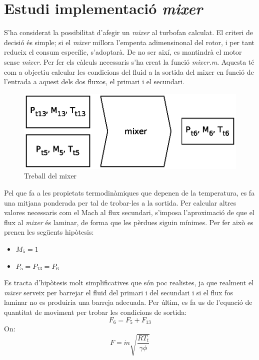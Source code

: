 \section{Estudi implementació \textit{mixer}}
S'ha considerat la possibilitat d'afegir un \textit{mixer} al turbofan calculat. El criteri de decisió és simple; si el \textit{mixer} millora l'empenta adimensinonal del rotor, i per tant redueix el consum específic, s'adoptarà. De no ser així, es mantindrà el motor sense \textit{mixer}. Per fer els càlculs necessaris s'ha creat la funció \textit{mixer.m}. Aquesta té com a objectiu calcular les condicions del fluid a la sortida del mixer en funció de l'entrada a aquest dels dos fluxos, el primari i el secundari.
\begin{figure}[H]
	\centering
	\includegraphics[scale=0.65]{./pics/mixer.eps}
	\caption{Treball del mixer}
\end{figure}
\noindent Pel que fa a les propietats termodinàmiques que depenen de la temperatura, es fa una mitjana ponderada per tal de trobar-les a la sortida. Per calcular altres valores necessaris com el Mach al flux secundari, s'imposa l'aproximació de que el flux al \textit{mixer} és laminar, de forma que les pèrdues siguin mínimes. Per fer això es prenen les següents hipòtesis:
\begin{itemize}
\item $M_5 = 1$
\item $P_5 = P_{13} = P_6$
\end{itemize}
Es tracta d'hipòtesis molt simplificatives que són poc realistes, ja que realment el \textit{mixer} serveix per barrejar el fluid del primari i del secundari i si el flux fos laminar no es produiria una barreja adecuada. 
Per últim, es fa us de l'equació de quantitat de moviment per trobar les condicions de sortida:
\begin{equation}
\label{ccm}
F_6 = F_5 + F_{13}
\end{equation}
On:
\begin{equation}
F = \dot{m}\sqrt{\frac{RT_t}{\gamma\phi}}
\end{equation}
